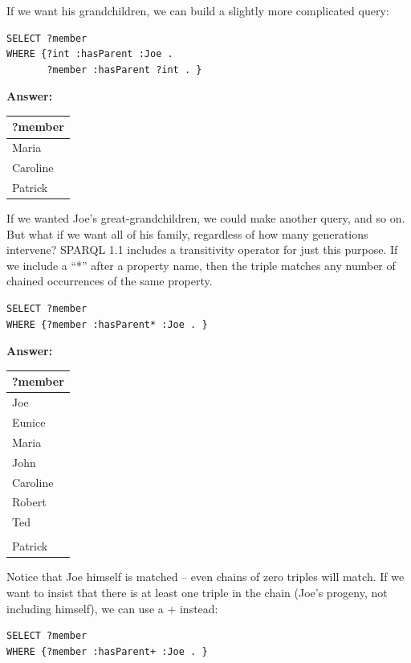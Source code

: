 If we want his grandchildren, we can build a slightly more complicated
query:


\begin{lstlisting}
SELECT ?member
WHERE {?int :hasParent :Joe .
       ?member :hasParent ?int . }
\end{lstlisting}

\textbf{\textbf{Answer:}}

\begin{tabular}{|l|}
\hline
?member\\
\hline
Maria\\
Caroline\\
Patrick\\
\hline
\end{tabular}

If we wanted Joe's great-grandchildren, we could make another query, and
so on. But what if we want all of his family, regardless of how many
generations intervene? SPARQL 1.1 includes a transitivity operator for
just this purpose. If we include a ``*'' after a property name, then the
triple matches any number of chained occurrences of the same property.


\begin{lstlisting}
SELECT ?member
WHERE {?member :hasParent* :Joe . }
\end{lstlisting}

\textbf{\textbf{Answer:}}

\begin{tabular}{|l|}
\hline
?member\\
\hline
Joe\\
Eunice\\
Maria\\
John\\
Caroline\\
Robert\\
Ted\\
\\
Patrick\\
\hline
\end{tabular}


Notice that Joe himself is matched -- even chains of zero triples will
match. If we want to insist that there is at least one triple in the
chain (Joe's progeny, not including himself), we can use a + instead:


\begin{lstlisting}
SELECT ?member
WHERE {?member :hasParent+ :Joe . }
\end{lstlisting}

